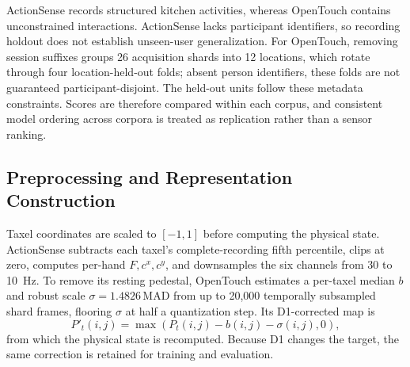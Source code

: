 \documentclass[letterpaper, 10 pt, conference]{ieeeconf}
\begin{document}
\begin{table}[t]
\caption{Corpora and held-out evaluation scope. Counts refer to extracted recordings for ActionSense and clips present in the frozen OpenTouch report.}
\label{tab:data}
\centering
\footnotesize
{}
\end{table}

ActionSense records structured kitchen activities, whereas OpenTouch contains unconstrained interactions. ActionSense lacks participant identifiers, so recording holdout does not establish unseen-user generalization. For OpenTouch, removing session suffixes groups 26 acquisition shards into 12 locations, which rotate through four location-held-out folds; absent person identifiers, these folds are not guaranteed participant-disjoint. The held-out units follow these metadata constraints. Scores are therefore compared within each corpus, and consistent model ordering across corpora is treated as replication rather than a sensor ranking.

\subsection{Preprocessing and Representation Construction}
Taxel coordinates are scaled to $[-1,1]$ before computing the physical state. ActionSense subtracts each taxel's complete-recording fifth percentile, clips at zero, computes per-hand $F,c^x,c^y$, and downsamples the six channels from 30 to 10~Hz. To remove its resting pedestal, OpenTouch estimates a per-taxel median $b$ and robust scale $\sigma=1.4826\,\mathrm{MAD}$ from up to 20,000 temporally subsampled shard frames, flooring $\sigma$ at half a quantization step. Its D1-corrected map is
\begin{equation}
P'_t(i,j)=\max\!\left(P_t(i,j)-b(i,j)-\sigma(i,j),0\right),
\end{equation}
from which the physical state is recomputed. Because D1 changes the target, the same correction is retained for training and evaluation.
\end{document}
